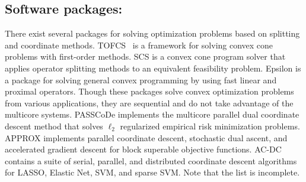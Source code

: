 \subsection*{Software packages:}
There exist several packages for solving optimization problems based on splitting and coordinate methods.
TOFCS~\citep{becker2011templates} is a framework for solving convex cone problems with first-order methods.
SCS \citep{ocpb:16} is a convex cone program solver that applies operator splitting methods to an equivalent feasibility problem.
Epsilon \citep{wytock2015convex} is a package for solving general convex programming by using fast linear and proximal operators.
Though these packages solve convex optimization problems from various applications, they are sequential and do not take advantage of
the multicore systems.
PASSCoDe \citep{hsieh2015passcode} implements the multicore parallel dual coordinate descent method that solves $\ell_2$ regularized
empirical risk minimization problems.
APPROX\citep{fercoq2015accelerated} implements  parallel coordinate descent, stochastic dual ascent, and accelerated gradient descent for block superable objective functions.
AC-DC\citep{richtarik2016parallel} contains a suite of serial, parallel, and distributed coordinate descent algorithms for LASSO, Elastic Net, SVM, and sparse SVM.
Note that the list is incomplete.

